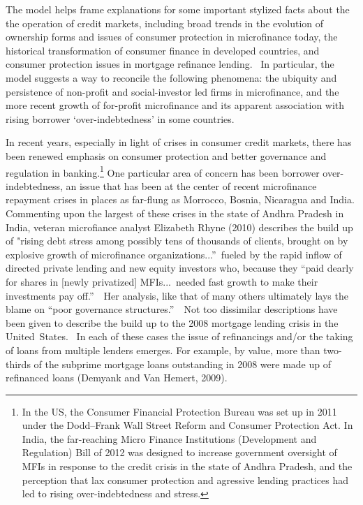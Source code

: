 \documentclass[11pt]{article}%
\begin{document}
The model helps frame explanations for some important stylized facts about the
the operation of credit markets, including broad trends in the evolution of
ownership forms and issues of consumer protection in microfinance today, the
historical transformation of consumer finance in developed countries, and
consumer protection issues in mortgage refinance lending. \ In particular, the
model suggests a way to reconcile the following phenomena: the ubiquity and
persistence of non-profit and social-investor led firms in microfinance, and
the more recent growth of for-profit microfinance and its apparent association
with rising borrower `over-indebtedness' in some countries.

In recent years, especially in light of crises in consumer credit markets,
there has been renewed emphasis on consumer protection and better governance
and regulation in banking.\footnote{In the US, the Consumer Financial
Protection Bureau was set up in 2011 under the Dodd--Frank Wall Street Reform
and Consumer Protection Act. In India, the far-reaching Micro Finance
Institutions (Development and Regulation) Bill of 2012 was designed to
increase government oversight of MFIs in response to the credit crisis in the
state of Andhra Pradesh, and the perception that lax consumer protection and
agressive lending practices had led to rising over-indebtedness and stress.}
One particular area of concern has been borrower over-indebtedness, an issue
that has been at the center of recent microfinance repayment crises in places
as far-flung as Morrocco, Bosnia, Nicaragua and India. Commenting upon the
largest of these crises in the state of Andhra Pradesh in India, veteran
microfiance analyst Elizabeth Rhyne (2010) describes the build up of "rising
debt stress among possibly tens of thousands of clients, brought on by
explosive growth of microfinance organizations...\textquotedblright\ fueled by
the rapid inflow of directed private lending and new equity investors who,
because they \textquotedblleft paid dearly for shares in [newly privatized]
MFIs...\ needed fast growth to make their investments pay
off.\textquotedblright\ \ Her analysis, like that of many others ultimately
lays the blame on \textquotedblleft poor governance
structures.\textquotedblright\ \ Not too dissimilar descriptions have been
given to describe the build up to the 2008 mortgage lending crisis in the
United\ States. \ In each of these cases the issue of refinancings and/or the
taking of loans from multiple lenders emerges. For example, by value, more
than two-thirds of the subprime mortgage loans outstanding in 2008 were made
up of refinanced loans (Demyank and Van Hemert, 2009).
\end{document}
